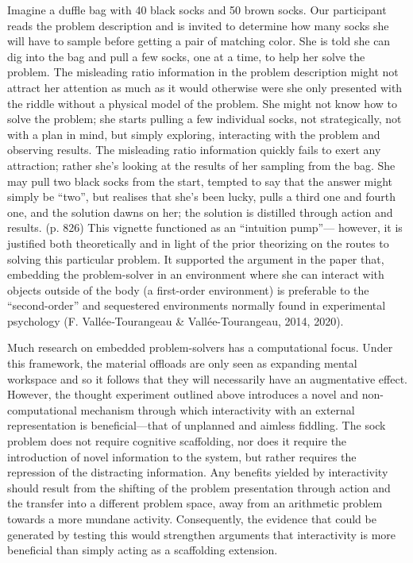 Imagine a duffle bag with 40 black socks and 50 brown socks. Our participant reads the problem description and is invited to determine how many socks she will have to sample before getting a pair of matching color. She is told she can dig into the bag and pull a few socks, one at a time, to help her solve the problem. The misleading ratio information in the problem description might not attract her attention as much as it would otherwise were she only presented with the riddle without a physical model of the problem. She might not know how to solve the problem; she starts pulling a few individual socks, not strategically, not with a plan in mind, but simply exploring, interacting with the problem and observing results. The misleading ratio information quickly fails to exert any attraction; rather she's looking at the results of her sampling from the bag. She may pull two black socks from the start, tempted to say that the answer might simply be ``two'', but realises that she's been lucky, pulls a third one and fourth one, and the solution dawns on her; the solution is distilled through action and results. (p. 826) 
This vignette functioned as an ``intuition pump''--- however, it is justified both theoretically and in light of the prior theorizing on the routes to solving this particular problem. It supported the argument in the paper that, embedding the problem-solver in an environment where she can interact with objects outside of the body (a first-order environment) is preferable to the ``second-order'' and sequestered environments normally found in experimental psychology (F.
Vallée‐Tourangeau \& Vallée-Tourangeau, 2014, 2020).

Much research on embedded problem-solvers has a computational focus.
Under this framework, the material offloads are only seen as expanding mental workspace and so it follows that they will necessarily have an augmentative effect. However, the thought experiment outlined above introduces a novel and non-computational mechanism through which interactivity with an external representation is beneficial---that of unplanned and aimless fiddling. The sock problem does not require cognitive scaffolding, nor does it require the introduction of novel information to the system, but rather requires the repression of the distracting information. Any benefits yielded by interactivity should result from the shifting of the problem presentation through action and the transfer into a different problem space, away from an arithmetic problem towards a more mundane activity. Consequently, the evidence that could be generated by testing this would strengthen arguments that interactivity is more beneficial than simply acting as a scaffolding extension.

